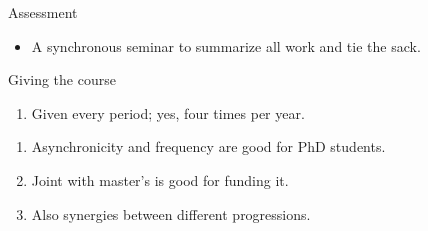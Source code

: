 \begin{frame}
\begin{columns}
\begin{column}{0.5\columnwidth}
\begin{figure}
      \end{figure}
    \end{column}
  \end{columns}
\end{frame}

\begin{frame}
  \begin{block}{Assessment}
    \begin{itemize}
      \item A synchronous seminar to summarize all work and tie the sack.
    \end{itemize}
  \end{block}
\end{frame}

\begin{frame}
  \begin{block}{Giving the course}
    \begin{enumerate}
      \item Given every period; yes, four times per year.
    \end{enumerate}
  \end{block}

  \pause

  \begin{remark}
    \begin{enumerate}
      \item Asynchronicity and frequency are good for PhD students.
      \item Joint with master's is good for funding it.
      \item Also synergies between different progressions.
    \end{enumerate}
  \end{remark}
\end{frame}


